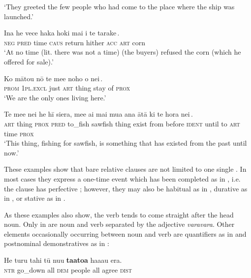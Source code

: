 \glt 
‘They greeted the few people who had come to the place where the ship was launched.’ \textstyleExampleref{[R250.235]} 
\z

\ea\label{ex:11.130}
\gll {\ꞌ}Ina he vece {\ob}haka hoki mai i te tarake\,{\cb}. \\
\textsc{neg} \textsc{pred} time {\db}\textsc{caus} return hither \textsc{acc} \textsc{art} corn \\

\glt 
‘At no time (lit. there was not a time) (the buyers) refused the corn (which he offered for sale).’ \textstyleExampleref{[R250.080]} 
\z

\ea\label{ex:11.131}
\gll Ko mātou nō te me{\ꞌ}e {\ob}noho o nei\,{\cb}. \\
\textsc{prom} \textsc{1pl.excl} just \textsc{art} thing {\db}stay of \textsc{prox} \\

\glt 
‘We are the only ones living here.’ \textstyleExampleref{[R404.050]} 
\z

\ea\label{ex:11.132}
\gll Te me{\ꞌ}e nei he hī siera, me{\ꞌ}e {\ob}ai mai mu{\ꞌ}a {\ꞌ}ana  {\ꞌ}ātā ki te hora nei\,{\cb}.\\
\textsc{art} thing \textsc{prox} \textsc{pred} to\_fish sawfish thing {\db}exist from before \textsc{ident}  until to \textsc{art} time \textsc{prox}\\

\glt
‘This thing, fishing for sawfish, is something that has existed from the past until now.’ \textstyleExampleref{[R364.001]} 
\z

These examples show that bare relative clauses are not limited to one single . In most cases they express a one-time event which has been completed as in , i.e. the clause has perfective ; however, they may also be habitual as in , durative as in , or stative as in .

As these examples also show, the verb tends to come straight after the head noun. Only in  are noun and verb separated by the adjective \textit{varavara}. Other elements occasionally occurring between noun and verb are quantifiers as in  and postnominal demonstratives as in :

\ea\label{ex:11.133}
\gll He turu tahi tū nu{\ꞌ}u \textbf{ta{\ꞌ}ato{\ꞌ}a} ha{\ꞌ}aau era. \\
\textsc{ntr} go\_down all \textsc{dem} people all agree \textsc{dist} \\


